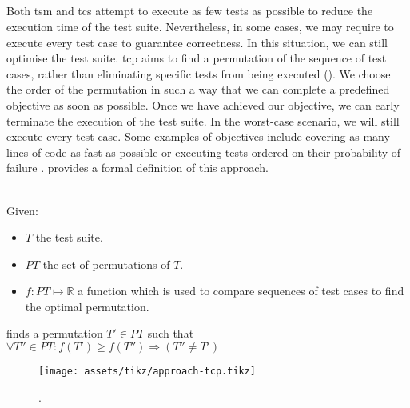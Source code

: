 
\subsection{\tcp{}}
Both \acrshort{tsm} and \acrshort{tcs} attempt to execute as few tests as possible to reduce the execution time of the test suite. Nevertheless, in some cases, we may require to execute every test case to guarantee correctness. In this situation, we can still optimise the test suite. \acrfull{tcp} aims to find a permutation of the sequence of test cases, rather than eliminating specific tests from being executed (). We choose the order of the permutation in such a way that we can complete a predefined objective as soon as possible. Once we have achieved our objective, we can early terminate the execution of the test suite. In the worst-case scenario, we will still execute every test case. Some examples of objectives include covering as many lines of code as fast as possible or executing tests ordered on their probability of failure \cite{10.1002/stv.430}.  provides a formal definition of this approach.

\begin{definition}[\tcp{}]
\label{def:tcp}
\mbox{}\\Given:
\begin{itemize}
	\item $T$ the test suite.
	\item $PT$ the set of permutations of $T$.
	\item $f: PT \mapsto \mathbb{R}$ a function which is used to compare sequences of test cases to find the optimal permutation.
\end{itemize}

\noindent \tcp{} finds a permutation $T' \in PT$ such that $\forall T'' \in PT : f(T') \ge f(T'') \Rightarrow (T'' \ne T')$ 
\end{definition}

\begin{figure}[htbp!]
	\centering
	\texttt{[image: assets/tikz/approach-tcp.tikz]}
	\caption{\tcp{}.}
	\label{fig:tcp}
\end{figure}